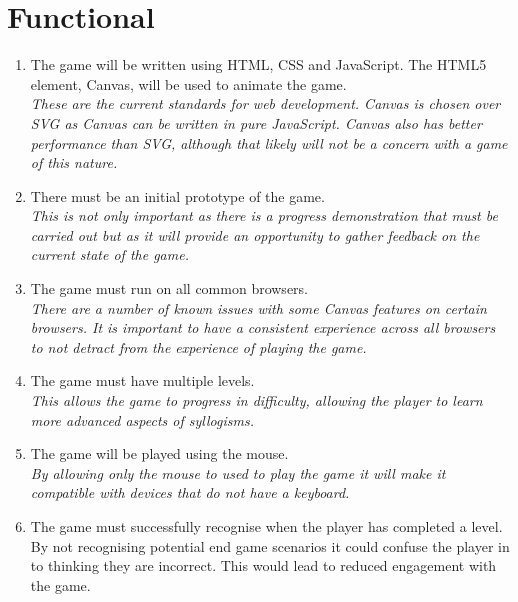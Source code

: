 \documentclass[12pt,a4paper]{report}
\begin{document}
   \section{Functional}
   \begin{enumerate}[label*=\thesection .\arabic*]
            \item The game will be written using HTML, CSS and JavaScript. The HTML5 element, Canvas, will be used to animate the game.\\
            \textit{These are the current standards for web development. Canvas is chosen over SVG as Canvas can be written in pure JavaScript. Canvas also has better performance than SVG, although that likely will not be a concern with a game of this nature. }
            \item There must be an initial prototype of the game.\\
            \textit{This is not only important as there is a progress demonstration that must be carried out but as it will provide an opportunity to gather feedback on the current state of the game.}
            \item The game must run on all common browsers.\\
            \textit{There are a number of known issues with some Canvas features on certain browsers. It is important to have a consistent experience across all browsers to not detract from the experience of playing the game. }
            \item The game must have multiple levels.\\
            \textit{This allows the game to progress in difficulty, allowing the player to learn more advanced aspects of syllogisms.}
            \item The game will be played using the mouse.\\
            \textit{By allowing only the mouse to used to play the game it will make it compatible with devices that do not have a keyboard.}
            \item The game must successfully recognise when the player has completed a level.\\
            {By not recognising potential end game scenarios it could confuse the player in to thinking they are incorrect. This would lead to reduced engagement with the game.}
        \end{enumerate}
\end{document}
